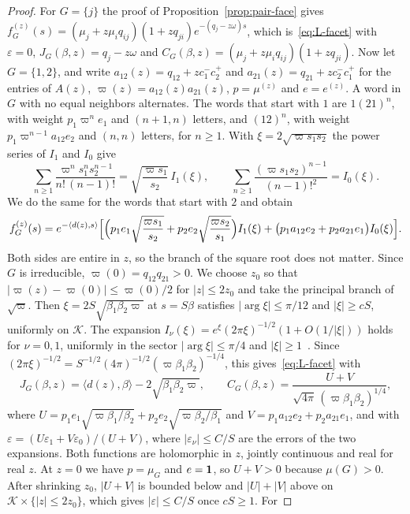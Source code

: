 \begin{proof}
For $G=\{j\}$ the proof of Proposition~\ref{prop:pair-face} gives
$f^{(z)}_G(s)=(\mu_j+z\mu_iq_{ij})(1+zq_{ji})e^{-(q_j-z\omega)s}$, which is~\eqref{eq:L-facet}
with $\varepsilon=0$, $J_G(\beta,z)=q_j-z\omega$ and
$C_G(\beta,z)=(\mu_j+z\mu_iq_{ij})(1+zq_{ji})$. Now let $G=\{1,2\}$, and write
$a_{12}(z)=q_{12}+zc^-_1c^+_2$ and $a_{21}(z)=q_{21}+zc^-_2c^+_1$ for
the entries of $A(z)$, $\varpi(z)=a_{12}(z)a_{21}(z)$, $p=\mu^{(z)}$ and $e=e^{(z)}$. A word in $G$
with no equal neighbors alternates. The words that start with $1$ are $1(21)^n$, with weight
$p_1\varpi^ne_1$ and $(n+1,n)$ letters, and $(12)^n$, with weight $p_1\varpi^{n-1}a_{12}e_2$ and
$(n,n)$ letters, for $n\ge1$. With $\xi=2\sqrt{\varpi s_1s_2}$ the power series of $I_1$ and $I_0$
give
\[
\sum_{n\ge1}\frac{\varpi^ns_1^ns_2^{n-1}}{n!\,(n-1)!}=\sqrt{\frac{\varpi s_1}{s_2}}\,I_1(\xi),\qquad
\sum_{n\ge1}\frac{(\varpi s_1s_2)^{n-1}}{(n-1)!^2}=I_0(\xi).
\]
We do the same for the words that start with $2$ and obtain
\[
f^{(z)}_G(s)=e^{-\langle d(z),s\rangle}\Bigl[\Bigl(p_1e_1\sqrt{\frac{\varpi s_1}{s_2}}+p_2e_2\sqrt{\frac{\varpi s_2}{s_1}}\Bigr)I_1(\xi)
+\bigl(p_1a_{12}e_2+p_2a_{21}e_1\bigr)I_0(\xi)\Bigr].
\]
Both sides are entire in $z$, so the branch of the square root does not matter. Since $G$ is
irreducible, $\varpi(0)=q_{12}q_{21}>0$. We choose $z_0$ so that $|\varpi(z)-\varpi(0)|\le\varpi(0)/2$
for $|z|\le2z_0$ and take the principal branch of $\sqrt\varpi$. Then
$\xi=2S\sqrt{\beta_1\beta_2\varpi}$ at $s=S\beta$ satisfies $|\arg\xi|\le\pi/12$ and $|\xi|\ge cS$,
uniformly on $\mathcal K$. The expansion $I_\nu(\xi)=e^\xi(2\pi\xi)^{-1/2}(1+O(1/|\xi|))$ holds
for $\nu=0,1$, uniformly in the sector $|\arg\xi|\le\pi/4$ and $|\xi|\ge1$~\cite[Eq.~10.40.1]{dlmf}.
Since $(2\pi\xi)^{-1/2}=S^{-1/2}(4\pi)^{-1/2}(\varpi\beta_1\beta_2)^{-1/4}$, this
gives~\eqref{eq:L-facet} with
\[
J_G(\beta,z)=\langle d(z),\beta\rangle-2\sqrt{\beta_1\beta_2\varpi},\qquad
C_G(\beta,z)=\frac{U+V}{\sqrt{4\pi}\,(\varpi\beta_1\beta_2)^{1/4}},
\]
where $U=p_1e_1\sqrt{\varpi\beta_1/\beta_2}+p_2e_2\sqrt{\varpi\beta_2/\beta_1}$ and
$V=p_1a_{12}e_2+p_2a_{21}e_1$, and with $\varepsilon=(U\varepsilon_1+V\varepsilon_0)/(U+V)$, where
$|\varepsilon_\nu|\le C/S$ are the errors of the two expansions. Both functions are holomorphic
in $z$, jointly continuous and real for real $z$. At $z=0$ we have $p=\mu_G$ and $e=\mathbf{1}$, so
$U+V>0$ because $\mu(G)>0$. After shrinking $z_0$, $|U+V|$ is bounded below and $|U|+|V|$ above
on $\mathcal K\times\{|z|\le2z_0\}$, which gives $|\varepsilon|\le C/S$ once $cS\ge1$. For

\end{proof}
